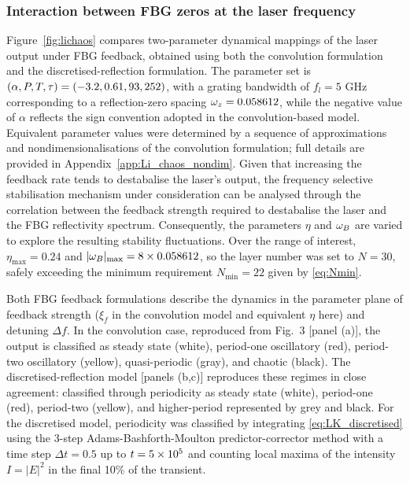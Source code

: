 \subsubsection{Interaction between FBG zeros at the laser frequency}
\label{subsubsec:lichaos}
%
Figure~\ref{fig:lichaos} compares two-parameter dynamical mappings of the laser output under FBG feedback, obtained using both the convolution formulation \cite{li2012distributed,li2015chaotic,li2020stable} and the discretised-reflection formulation.
The parameter set is $(\alpha, P, T, \tau) = (-3.2, 0.61, 93, 252)$, with a grating bandwidth of $f_l = 5$ GHz corresponding to a reflection-zero spacing $\omega_z = 0.058612$, while the negative value of $\alpha$ reflects the sign convention adopted in the convolution-based model.
Equivalent parameter values were determined by a sequence of approximations and nondimensionalisations of the convolution formulation; full details are provided in Appendix~\ref{app:Li_chaos_nondim}.
Given that increasing the feedback rate tends to destabalise the laser's output, the frequency selective stabilisation mechanism under consideration can be analysed through the correlation between the feedback strength required to destabalise the laser and the FBG reflectivity spectrum.
Consequently, the parameters $\eta$ and $\omega_B$ are varied to explore the resulting stability fluctuations.
Over the range of interest, $\eta_\text{max} = 0.24$ and $|\omega_B|_\text{max} = 8 \times 0.058612$, so the layer number was set to $N=30$, safely exceeding the minimum requirement $N_\text{min}=22$ given by \eqref{eq:Nmin}.
%
\par
%
Both FBG feedback formulations describe the dynamics in the parameter plane of feedback strength ($\xi_f$ in the convolution model and equivalent $\eta$ here) and detuning $\Delta f$.
In the convolution case, reproduced from \cite{li2015chaotic} Fig.~3 [panel (a)], the output is classified as steady state (white), period-one oscillatory (red), period-two oscillatory (yellow), quasi-periodic (gray), and chaotic (black).
The discretised-reflection model [panels (b,c)] reproduces these regimes in close agreement: classified through periodicity as steady state (white), period-one (red), period-two (yellow), and higher-period represented by grey and black.
For the discretised model, periodicity was classified by integrating \eqref{eq:LK_discretised} using the 3-step  Adams-Bashforth-Moulton predictor-corrector method with a time step $\Delta t = 0.5$ up to $t = 5\times 10^{5}$ and counting local maxima of the intensity $I = |E|^2$ in the final 10\% of the transient.
